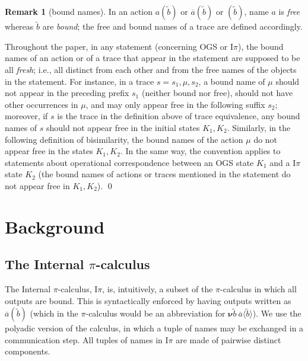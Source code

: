 \documentclass[11pt,a4paper]{amsart}
\theoremstyle{plain}
\theoremstyle{definition}
\theoremstyle{defC}
\theoremstyle{thmC}
\theoremstyle{plain}
\numberwithin{equation}{section}
\newcommand{\trace}{s}
\newcommand{\obj}[1]{\langle #1 \rangle}
\def\res#1{{\boldsymbol \nu} #1\:}   %
\def\out#1#2{\overline{#1}\obj{#2}}
\def\inp#1#2{#1(#2)}
\def\bout#1#2{\overline{#1}(#2)}   %
\newcommand{\til}[1]{\widetilde{#1}}
\newcommand{\tilb}{{\til b}}
\newcommand{\Intp}{\mbox{I$\pi$}\xspace}   %
\newcommand{\piI}{\Intp}   %
\theoremstyle{plain}
\theoremstyle{definition}
\newtheorem{remark}[thm]{Remark}
\begin{document}
\begin{remark}[bound names]
\label{r:bn} 
In an action $\inp a \tilb$ or $\bout a \tilb$ or $(\tilb)$, 
name $a$ is \emph{free} whereas $\tilb$ are \emph{bound}; 
the free and bound names of a trace are defined accordingly.


Throughout the paper, 
in any statement (concerning OGS or \piI), the bound names of an action or of a trace that
appear in the statement are supposed to be all \emph{fresh}; i.e.,  
all distinct from each other and from the free names of the objects in the statement. 
For instance, in a  trace $s= s_1, \mu, s_2$, a  bound name of $\mu$ should not appear in the
preceding prefix  $s_1$
(neither bound nor free), should not have other occurrences  in $\mu$, 
and may only appear free in the following suffix  $s_2$; moreover, if  
$s$ is the trace 
in the definition above  of trace equivalence,  any  bound names  of
$s$ should not appear free in the initial states $K_1,K_2$.  
Similarly, in the following definition of bisimilarity, the bound names of the action $\mu$ do
not appear free in the states $K_1,K_2$. 
In the same way, the convention applies to statements about operational correspondence between an
OGS state $K_1$ and a \piI state $K_2$ (the bound names of actions or traces mentioned in
the statement do not appear free in  $K_1,K_2$).
\qed\end{remark}
\section{Background}
\label{s:back}

\subsection{The Internal $\pi$-calculus}
\label{ss:piI}

The Internal $\pi$-calculus, $\piI$, is, intuitively, 
a subset of the $\pi$-calculus 
in which all outputs are bound. This is syntactically enforced by
having outputs written as $\bout a\tilb$ (which in the $\pi$-calculus would be an
abbreviation for $\res\tilb \out a \tilb$). 
We use the polyadic version of the calculus, in which a tuple of names may be exchanged in
a communication step. 
All tuples of names in \piI 
are made of pairwise distinct components. 
\end{document}
